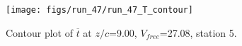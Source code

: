 \begin{figure}[H]
\centering
\texttt{[image: figs/run\_47/run\_47\_T\_contour]}
\caption{Contour plot of $\overline{t}$ at $z/c$=9.00, $V_{free}$=27.08, station 5.}
\end{figure}


